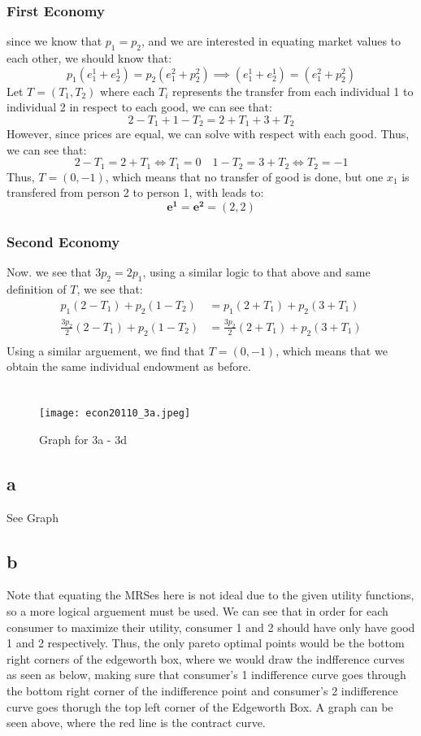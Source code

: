 \documentclass[11pt]{article}
\begin{document}
\subsubsection*{First Economy}
since we know that $p_1 = p_2$, and we are interested in equating market values to each other, we should know that:
\[
p_1(e_1^1 + e_2^1) = p_2(e_1^2 + p_2^2) \implies (e_1^1 + e_2^1) = (e_1^2 + p_2^2)
\]
Let $T = (T_1, T_2)$ where each $T_i$ represents the transfer from each individual 1 to individual 2 in respect to each good, we can see that:
\[
2 - T_1 + 1 - T_2 = 2 + T_1 + 3 + T_2 
\]
However, since prices are equal, we can solve with respect with each good. Thus, we can see that:
\[
2 - T_1 = 2 + T_1 \iff T_1 = 0 \quad 1 - T_2 = 3 + T_2 \iff T_2 = -1
\]
Thus, $T = (0, -1)$, which means that no transfer of good is done, but one $x_1$ is transfered from person 2 to person 1, with leads to:
\[
\mathbf{e^1} = \mathbf{e^2}= (2, 2)
\]
\subsubsection*{Second Economy}
Now. we see that $3p_2 = 2p_1$, using a similar logic to that above and same definition of $T$, we see that:
\begin{align*}
    p_1(2-T_1) + p_2(1-T_2) &= p_1(2+T_1) + p_2(3 + T_1)\\
    \frac{3p_2}{2}(2 - T_1) + p_2(1 - T_2) &= \frac{3p_2}{2}(2+T_1) + p_2(3+T_1)\\
\end{align*}
Using a similar arguement, we find that $T = (0, -1)$, which means that we obtain the same individual endowment as before.
\newpage
\section{}
\begin{figure}[H]
    \centering
    \texttt{[image: econ20110\_3a.jpeg]}
    \caption{Graph for 3a - 3d}
    \label{fig:aentaesras-aslasasabel}
\end{figure}
\subsection*{a}
See Graph
\subsection*{b}
Note that equating the MRSes here is not ideal due to the given utility functions, so a more logical arguement must be used. We can see that in order for each consumer to maximize their utility, consumer 1 and 2 should have only have good 1 and 2 respectively. Thus, the only pareto optimal points would be the bottom right corners of the edgeworth box, where we would draw the indfference curves as seen as below, making sure that consumer's 1 indifference curve goes through the bottom right corner of the indifference point and consumer's 2 indifference curve goes thorugh the top left corner of the Edgeworth Box. A graph can be seen above, where the red line is the contract curve. 
\end{document}
